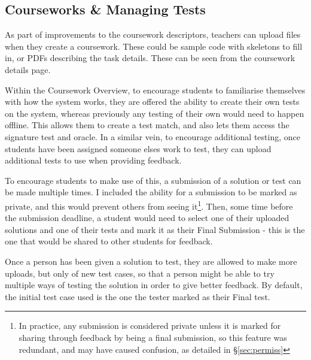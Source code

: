 \documentclass[a4paper,11pt]{report}
\begin{document}
\subsection{Courseworks \& Managing Tests}
As part of improvements to the coursework descriptors, teachers can upload files when they create a coursework. These could be sample code with skeletons to fill in, or PDFs describing the task details. These can be seen from the coursework details page.\par
Within the Coursework Overview, to encourage students to familiarise themselves with how the system works, they are offered the ability to create their own tests on the system, whereas previously any testing of their own would need to happen offline. This allows them to create a test match, and also lets them access the signature test and oracle. In a similar vein, to encourage additional testing, once students have been assigned someone elses work to test, they can upload additional tests to use when providing feedback.\par
To encourage students to make use of this, a submission of a solution or test can be made multiple times. I included the ability for a submission to be marked as private, and this would prevent others from seeing it\footnote{In practice, any submission is considered private unless it is marked for sharing through feedback by being a final submission, so this feature was redundant, and may have caused confusion, as detailed in \S\ref{sec:permiss}}. Then, some time before the submission deadline, a student would need to select one of their uploaded solutions and one of their tests and mark it as their Final Submission - this is the one that would be shared to other students for feedback.\par
Once a person has been given a solution to test, they are allowed to make more uploads, but only of new test cases, so that a person might be able to try multiple ways of testing the solution in order to give better feedback. By default, the initial test case used is the one the tester marked as their Final test.
\end{document}
